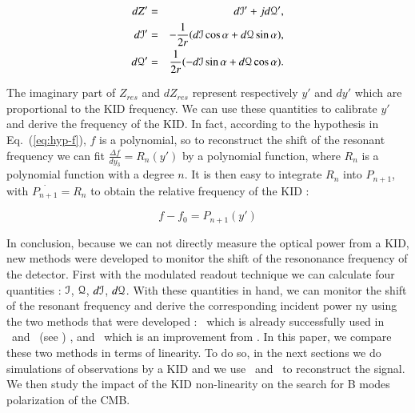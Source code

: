 \begin{eqnarray}
dZ' &=& d\mathcal{I}' + jd\mathcal{Q}',\\
d\mathcal{I}' &=& -\frac{1}{2r}(d\mathcal{I} \cos \alpha + d\mathcal{Q} \sin \alpha), \\
d\mathcal{Q}' &=& \frac{1}{2r}(-d\mathcal{I} \sin \alpha + d\mathcal{Q} \cos \alpha).
\end{eqnarray}

The imaginary part of $Z_{res}$ and $dZ_{res}$ represent respectively $y'$ and
$dy'$ which are proportional to the KID frequency. We can use these quantities
to calibrate $y'$ and derive the frequency of the KID. In fact, according to the
hypothesis in Eq.~(\ref{eq:hyp-f}), $f$ is a polynomial, so to reconstruct the
shift of the resonant frequency we can fit $\frac{\Delta f}{dy_{3}} = R_{n}(y')$
by a polynomial function, where $R_{n}$ is a polynomial function with a degree
$n$. It is then easy to integrate $R_{n}$ into $P_{n+1}$, with
$\overset{.}{P_{n+1}}=R_{n}$ to obtain the relative frequency of the KID :

\begin{equation}
f - f_{0} = P_{n+1}(y')
\end{equation}

 In conclusion, because we can not directly
measure the optical power from a KID, new methods were developed to monitor the
shift of the resononance frequency of the detector. First with the modulated
readout technique we can calculate four quantities : $\mathcal{I}$, $\mathcal{Q}$, $d\mathcal{I}$,
$d\mathcal{Q}$. With these quantities in hand, we can monitor the shift of the resonant
frequency and derive the corresponding incident power ny using the two methods
that were developed : \rf\ which is already successfully used in \nika\ and
\ (see \citep{2014A&A...569A...9C}) , and \cf\ which is an improvement
from \rf . In this paper, we compare these two methods in terms of linearity. To
do so, in the next sections we do simulations of observations by a KID and we
use \rf\ and \cf\ to reconstruct the signal. We then study the impact of the KID
non-linearity on the search for B modes polarization of the CMB.
